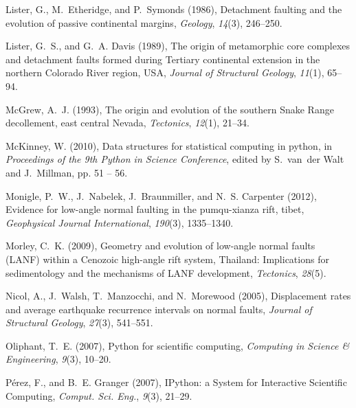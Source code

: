\documentclass[draft,grl]{AGUTeX}
\begin{document}
\begin{article}
\begin{thebibliography}{46}
Lister, G., M.~Etheridge, and P.~Symonds (1986), Detachment faulting and the
  evolution of passive continental margins, \textit{Geology}, \textit{14}(3),
  246--250.

Lister, G.~S., and G.~A. Davis (1989), The origin of metamorphic core complexes
  and detachment faults formed during {T}ertiary continental extension in the
  northern {C}olorado {R}iver region, {U}{S}{A}, \textit{Journal of Structural
  Geology}, \textit{11}(1), 65--94.

McGrew, A.~J. (1993), The origin and evolution of the southern {S}nake {R}ange
  decollement, east central {N}evada, \textit{Tectonics}, \textit{12}(1),
  21--34.

McKinney, W. (2010), Data structures for statistical computing in python, in
  \textit{Proceedings of the 9th Python in Science Conference}, edited by
  S.~van~der Walt and J.~Millman, pp. 51 -- 56.

Monigle, P.~W., J.~Nabelek, J.~Braunmiller, and N.~S. Carpenter (2012),
  Evidence for low-angle normal faulting in the pumqu-xianza rift, tibet,
  \textit{Geophysical Journal International}, \textit{190}(3), 1335--1340.

Morley, C.~K. (2009), Geometry and evolution of low-angle normal faults
  ({L}{A}{N}{F}) within a {C}enozoic high-angle rift system, {T}hailand:
  Implications for sedimentology and the mechanisms of {LANF} development,
  \textit{Tectonics}, \textit{28}(5).

Nicol, A., J.~Walsh, T.~Manzocchi, and N.~Morewood (2005), Displacement rates
  and average earthquake recurrence intervals on normal faults, \textit{Journal
  of Structural Geology}, \textit{27}(3), 541--551.

Oliphant, T.~E. (2007), Python for scientific computing, \textit{Computing in
  Science \& Engineering}, \textit{9}(3), 10--20.

P\'erez, F., and B.~E. Granger (2007), {IP}ython: a {S}ystem for {I}nteractive
  {S}cientific {C}omputing, \textit{{C}omput. {S}ci. {E}ng.}, \textit{9}(3),
  21--29.


\end{thebibliography}
\end{article}
\end{document}
